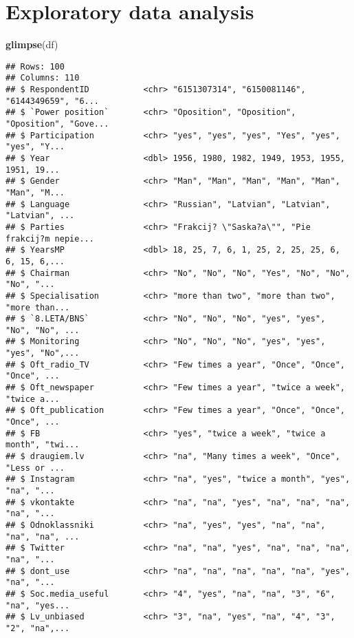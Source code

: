 \documentclass[
]{article}
\newenvironment{Shaded}{\begin{snugshade}}{\end{snugshade}}
\newcommand{\KeywordTok}[1]{\textcolor[rgb]{0.13,0.29,0.53}{\textbf{#1}}}
\newcommand{\NormalTok}[1]{#1}
\begin{document}
\hypertarget{exploratory-data-analysis}{%
\section{Exploratory data analysis}\label{exploratory-data-analysis}}

\begin{Shaded}
\begin{Highlighting}[]
\KeywordTok{glimpse}\NormalTok{(df)}
\end{Highlighting}
\end{Shaded}

\begin{verbatim}
## Rows: 100
## Columns: 110
## $ RespondentID           <chr> "6151307314", "6150081146", "6144349659", "6...
## $ `Power position`       <chr> "Oposition", "Oposition", "Oposition", "Gove...
## $ Participation          <chr> "yes", "yes", "yes", "Yes", "yes", "yes", "Y...
## $ Year                   <dbl> 1956, 1980, 1982, 1949, 1953, 1955, 1951, 19...
## $ Gender                 <chr> "Man", "Man", "Man", "Man", "Man", "Man", "M...
## $ Language               <chr> "Russian", "Latvian", "Latvian", "Latvian", ...
## $ Parties                <chr> "Frakcij? \"Saska?a\"", "Pie frakcij?m nepie...
## $ YearsMP                <dbl> 18, 25, 7, 6, 1, 25, 2, 25, 25, 6, 6, 15, 6,...
## $ Chairman               <chr> "No", "No", "No", "Yes", "No", "No", "No", "...
## $ Specialisation         <chr> "more than two", "more than two", "more than...
## $ `8.LETA/BNS`           <chr> "No", "No", "No", "yes", "yes", "No", "No", ...
## $ Monitoring             <chr> "No", "No", "No", "yes", "yes", "yes", "No",...
## $ Oft_radio_TV           <chr> "Few times a year", "Once", "Once", "Once", ...
## $ Oft_newspaper          <chr> "Few times a year", "twice a week", "twice a...
## $ Oft_publication        <chr> "Few times a year", "Once", "Once", "Once", ...
## $ FB                     <chr> "yes", "twice a week", "twice a month", "twi...
## $ draugiem.lv            <chr> "na", "Many times a week", "Once", "Less or ...
## $ Instagram              <chr> "na", "yes", "twice a month", "yes", "na", "...
## $ vkontakte              <chr> "na", "na", "yes", "na", "na", "na", "na", "...
## $ Odnoklassniki          <chr> "na", "yes", "yes", "na", "na", "na", "na", ...
## $ Twitter                <chr> "na", "na", "yes", "na", "na", "na", "na", "...
## $ dont_use               <chr> "na", "na", "na", "na", "na", "yes", "na", "...
## $ Soc.media_useful       <chr> "4", "yes", "na", "na", "3", "6", "na", "yes...
## $ Lv_unbiased            <chr> "3", "na", "yes", "na", "4", "3", "2", "na",...

\end{verbatim}
\end{document}
